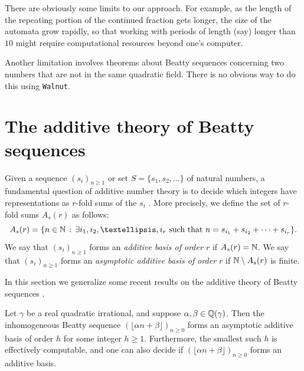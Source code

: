 \documentclass[12pt,reqno]{article}
\begin{document}
There are obviously some limits to our approach.  For example, as the
length of the repeating portion of the continued fraction gets longer,
the size of the automata grow rapidly, so that working with
periods of length (say) longer than $10$ might require computational
resources beyond one's computer.  

Another limitation involves theorems about Beatty sequences concerning
two numbers that are not in the same quadratic field.  There is no
obvious way to do this using \texttt{Walnut}.

\section{The additive theory of Beatty sequences}
\label{additive}

Given a sequence $(s_i)_{n \geq 1}$ or set $S = \{s_1, s_2,
\ldots \}$ of natural numbers,
a fundamental question of additive number theory is to decide 
which integers have representations as $r$-fold sums of the $s_i$
\cite{Nathanson:1996,Nathanson:2000}.  
More precisely, we define the set of $r$-fold
sums $A_s(r)$ as follows:
$$A_s(r) = \{ n \in \Enn \suchthat \exists i_1, i_2, \ldots, i_r
 \text{ such that } n = s_{i_1} + s_{i_2} + \cdots + s_{i_r} \}.$$
We say that $(s_i)_{n \geq 1}$ forms an {\it additive basis of
order $r$} if $A_s(r) = \mathbb{N}$.  We say that $(s_i)_{n \geq 1}$ forms
an {\it asymptotic additive basis of order $r$}
if $\mathbb{N} \setminus A_s(r)$ is finite.

In this section we generalize some recent results on the additive theory of Beatty sequences \cite{Kawsumarng:2021,Phunphayap&Pongsriiam&Shallit:2022,Shallit:2022,Dekking:2022}.

\begin{theorem}
Let $\gamma$ be a real quadratic irrational, and suppose
$\alpha, \beta \in \mathbb{Q}(\gamma)$.  Then
the inhomogeneous Beatty sequence $(\lfloor \alpha n + \beta\rfloor)_{n \geq 0}$
forms an asymptotic additive basis of order $h$ for some
integer $h \geq 1$.  Furthermore, the smallest such $h$ is
effectively computable, and one can also decide if
$(\lfloor \alpha n + \beta\rfloor)_{n \geq 0}$ forms an additive basis.
\end{theorem}
\end{document}

